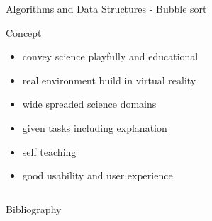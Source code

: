 \documentclass[final,hyperref={pdfpagelabels=false}]{beamer}
\begin{document}
\begin{frame}[t]
\begin{columns}[t]
\begin{column}{.465\textwidth}
\begin{block}{Algorithms and Data Structures - Bubble sort}
\begin{figure}
	\end{figure}
\end{block}

\vspace{0.3cm}

\begin{block}{Concept}
	
		\vspace{30px}
	
	\begin{itemize}
		\item convey science playfully and educational
		\vspace{10px}
		\item real environment build in virtual reality
				\vspace{10px}
		\item wide spreaded science domains
				\vspace{10px}
		\item given tasks including explanation
				\vspace{10px}
		\item self teaching
				\vspace{10px}
		\item good usability and user experience
				\vspace{10px}
	\end{itemize}

\vspace{30px}

\end{block}

\vspace{0.1cm}

\end{column} %

\begin{column}{.015\textwidth}\end{column} %

\end{columns} %

\begin{block}{Bibliography}
	
\end{block}

\end{frame} %
\end{document}
